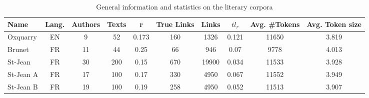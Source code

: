 \begin{table*}
  \centering
  \caption{General information and statistics on the literary corpora}
  \label{tab:lit_corpora}
  \begin{tabular}{ l c c c c c c c c c }
    \toprule
    \textbf{Name} &
    \textbf{Lang.} &
    \textbf{Authors} &
    \textbf{Texts} &
    \textbf{r} &
    \textbf{True Links} &
    \textbf{Links} &
    \textbf{$tl_r$} &
    \textbf{Avg. \#Tokens} &
    \textbf{Avg. Token size} \\
    \midrule
    Oxquarry & EN & 9 & 52 & 0.173 & 160 & 1326 & 0.121 & 11650 & 3.819 \\
    Brunet & FR & 11 & 44 & 0.25 & 66 & 946 & 0.07 & 9778 & 4.013 \\
    St-Jean & FR & 30 & 200 & 0.15 & 670 & 19900 & 0.034 & 11533 & 3.928 \\
    St-Jean A & FR & 17 & 100 & 0.17 & 330 & 4950 & 0.067 & 11552 & 3.949 \\
    St-Jean B & FR & 19 & 100 & 0.19 & 258 & 4950 & 0.052 & 11513 & 3.907 \\
    \bottomrule
  \end{tabular}
\end{table*}
